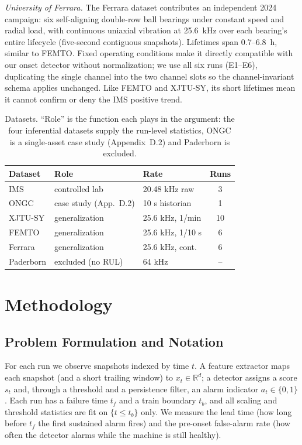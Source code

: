 \documentclass[IJPHM, 2026, 0]{PHMSociety}
\begin{document}
\emph{University of Ferrara.} The Ferrara dataset \cite{arpa2024ferrara} contributes an independent 2024 campaign: six self-aligning double-row ball bearings under constant speed and radial load, with continuous uniaxial vibration at 25.6~kHz over each bearing's entire lifecycle (five-second contiguous snapshots). Lifetimes span 0.7--6.8~h, similar to FEMTO. Fixed operating conditions make it directly compatible with our onset detector without normalization; we use all six runs (E1--E6), duplicating the single channel into the two channel slots so the channel-invariant schema applies unchanged. Like FEMTO and XJTU-SY, its short lifetimes mean it cannot confirm or deny the IMS positive trend.

\begin{table}[t] \small
	\begin{center}
	\caption{Datasets. ``Role'' is the function each plays in the argument: the four inferential datasets supply the run-level statistics, ONGC is a single-asset case study (Appendix~D.2) and Paderborn is excluded.}
	\label{tab:datasets}
	\begin{tabular}{l l l c}
		\hline \hline
		\textbf{Dataset} & \textbf{Role} & \textbf{Rate} & \textbf{Runs} \\
		\hline
		IMS & controlled lab & 20.48 kHz raw & 3 \\
		ONGC & case study (App.~D.2) & 10 s historian & 1 \\
		XJTU-SY & generalization & 25.6 kHz, 1/min & 10 \\
		FEMTO & generalization & 25.6 kHz, 1/10 s & 6 \\
		Ferrara & generalization & 25.6 kHz, cont. & 6 \\
		Paderborn & excluded (no RUL) & 64 kHz & -- \\
		\hline \hline
	\end{tabular}
	\end{center}
\end{table}

\section{Methodology}

\subsection{Problem Formulation and Notation}
For each run we observe snapshots indexed by time $t$. A feature extractor maps each snapshot (and a short trailing window) to $x_t \in \mathbb{R}^d$; a detector assigns a score $s_t$ and, through a threshold and a persistence filter, an alarm indicator $a_t \in \{0,1\}$. Each run has a failure time $t_f$ and a train boundary $t_b$, and all scaling and threshold statistics are fit on $\{t \le t_b\}$ only. We measure the lead time (how long before $t_f$ the first sustained alarm fires) and the pre-onset false-alarm rate (how often the detector alarms while the machine is still healthy).
\end{document}

